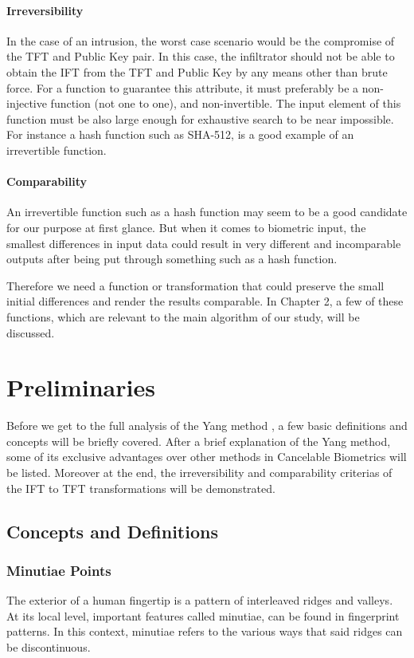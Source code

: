 \documentclass[fyp]{socreport}
\begin{document}
\subsubsection{Irreversibility}
In the case of an intrusion, the worst case scenario would be the compromise of the TFT and Public Key pair. In this case, the infiltrator should not be able to obtain the IFT from the TFT and Public Key by any means other than brute force. For a function to guarantee this attribute, it must preferably be a non-injective function (not one to one), and non-invertible. The input element of this function must be also large enough for exhaustive search to be near impossible. For instance a hash function such as SHA-512, is a good example of an irrevertible function. 

\subsubsection{Comparability}
An irrevertible function such as a hash function may seem to be a good candidate for our purpose at first glance. But when it comes to biometric input, the smallest differences in input data could result in very different and incomparable outputs after being put through something such as a hash function.

Therefore we need a function or transformation that could preserve the small initial differences and render the results comparable. In Chapter 2, a few of these functions, which are relevant to the main algorithm of our study, will be discussed.

\chapter{Preliminaries}
Before we get to the full analysis of the Yang method \cite{wencheng18cbio}, a few basic definitions and concepts will be briefly covered. After a brief explanation of the Yang method, some of its exclusive advantages over other methods in Cancelable Biometrics will be listed. Moreover at the end, the irreversibility and comparability criterias of the IFT to TFT transformations will be demonstrated.


\section{Concepts and Definitions}
\subsection{Minutiae Points}
The exterior of a human fingertip is a pattern of interleaved ridges and valleys. At its local level, important features called minutiae, can be found in fingerprint patterns. In this context, minutiae refers to the various ways that said ridges can be discontinuous. \cite{maltoni22fing}
\end{document}
